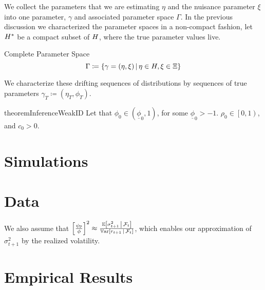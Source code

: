\documentclass[11pt, letterpaper, twoside, final]{article}
\begin{document}
We collect the parameters that we are estimating $\eta$ and the nuisance parameter $\xi$ into one parameter,
$\gamma$ and associated parameter space $\Gamma$.
In the previous discussion we characterized the parameter spaces in a non-compact fashion, let $H^{*}$ be a
compact subset of $H$, where the true parameter values live.

\begin{defn}{Complete Parameter Space}
    \begin{equation}
        \Gamma \coloneqq \left\lbrace \gamma = (\eta, \xi) \,\middle\vert\, \eta \in H, \xi \in \Xi \right\rbrace 
    \end{equation}
\end{defn}

We characterize these drifting sequences of distributions by sequences of true parameters $\gamma_T \coloneqq
(\eta_T, \phi_T)$.



\begin{restatable}{theorem}{InferenceWeakID}
    Let that $\phi_0  \in \left(\underline{\phi}_0,1\right)$, for some $\underline{\phi}_0 > -1$. 
    $\rho_0 \in \left[0,1\right)$, and $c_0 > 0$. 

\end{restatable}


\section{Simulations}

\section{Data}\label{sec:data}

We also assume that $\left[ \frac{\psi_{\mathbb{P}}}{\phi} \right]^2 \approx \frac{\operatorname{\mathbb{E}} \left[\sigma^2_{t+1} \,\middle\vert\,
\mathcal{F}_t\right]}{\operatorname{\mathbb{V}ar}\left[r_{t+1} \,\middle\vert\, \mathcal{F}_t\right]}$, which enables our approximation of $\sigma^2_{t+1}$ by the
realized volatility.

\section{Empirical Results}
\end{document}
